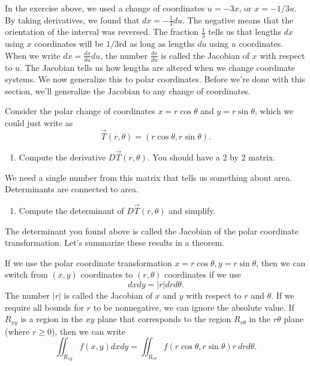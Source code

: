 In the exercise above, we used a change of coordinates $u=-3x$, or $x=-1/3 u$.  By taking derivatives, we found that $dx=-\frac{1}{3}du$. The negative means that the orientation of the interval was reversed. The fraction $\frac13$ tells us that lengths $dx$ using $x$ coordinates will be $1/3$rd as long as lengths $du$ using $u$ coordinates. When we write $dx = \frac{dx}{du}du$, the number $\frac{dx}{du}$ is called the Jacobian of $x$ with respect to $u$. The Jacobian tells us how lengths are altered when we change coordinate systems. We now generalize this to polar coordinates. Before we're done with this section, we'll generalize the Jacobian to any change of coordinates.

\begin{problem}
 Consider the polar change of coordinates $x=r\cos\theta$ and $y=r\sin\theta$, which we could just write as $$\vec T(r,\theta)=(r\cos\theta,r\sin\theta).$$
\begin{enumerate}
 \item Compute the derivative $D\vec T(r,\theta)$.  You should have a 2 by 2 matrix.
\end{enumerate}
 We need a single number from this matrix that tells us something about area.  Determinants are connected to area.  
\begin{enumerate}[resume]
	\item Compute the determinant of $D\vec T(r,\theta)$ and simplify.  
\end{enumerate}
\end{problem}

The determinant you found above is called the Jacobian of the polar coordinate transformation.  Let's summarize these results in a theorem. 



\begin{theorem}%
 If we use the polar coordinate transformation $x=r\cos\theta, y=r\sin\theta$, then we can switch from $(x,y)$ coordinates to $(r,\theta)$ coordinates if we use $$dxdy=|r|drd\theta.$$  The number $|r|$ is called the Jacobian of $x$ and $y$ with respect to $r$ and $\theta$. If we require all bounds for $r$ to be nonnegative, we can ignore the absolute value.  If $R_{xy}$ is a region in the $xy$ plane that corresponds to the region $R_{r\theta}$ in the $r\theta$ plane (where $r\geq 0$), then we can write $$\iint_{R_{xy}} f(x,y) dxdy = \iint_{R_{r\theta}} f(r\cos\theta,r\sin\theta) r\ drd\theta.$$ 
\end{theorem}

